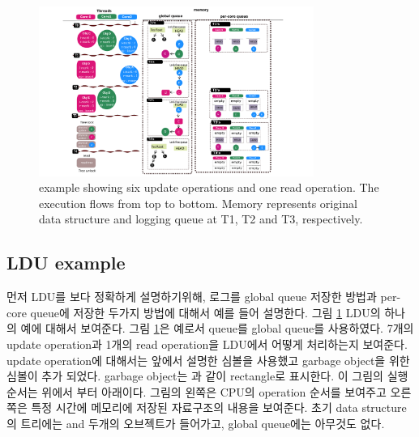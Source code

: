 \begin{figure}[t!]
  \begin{center}
     \includegraphics[width=0.8\textwidth,height=0.4\textheight,keepaspectratio]{fig/basic_gldu}
  \end{center}
  \caption{ example showing six update operations and one read
  operation. The execution flows from top to bottom. Memory represents original
  data structure and logging queue at T1, T2 and T3, respectively.}
  \label{fig:basic}
\end{figure}

\subsection{LDU example}

%


\ifkor
먼저 LDU를 보다 정확하게 설명하기위해, 로그를 global queue 저장한 방법과 per-core queue에 저장한 두가지 방법에 대해서
예를 들어 설명한다. 
그림 \ref{fig:basic} LDU의 하나의 예에 대해서 보여준다. 그림 \ref{fig:basic}은 예로서 queue를 global
queue를 사용하였다. 
7개의 update operation과 1개의 read operation을 LDU에서 어떻게 처리하는지 보여준다.
update operation에 대해서는 앞에서 설명한 심볼을 사용했고 garbage object을 위한 심볼이 추가 되었다.
garbage object는 과 같이 rectangle로 표시한다. 
이 그림의 실행 순서는 위에서 부터 아래이다.
그림의 왼쪽은 CPU의 operation 순서를 보여주고 오른쪽은 특정 시간에 메모리에 저장된 자료구조의 내용을 보여준다.
초기 data structure의 트리에는  and  두개의 오브젝트가 들어가고, global
queue에는 아무것도 없다.


